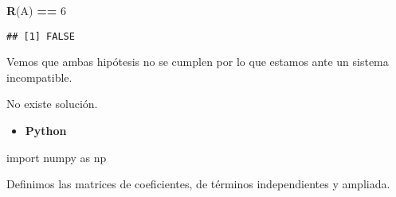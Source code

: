 \documentclass[
]{article}
\newenvironment{Shaded}{\begin{snugshade}}{\end{snugshade}}
\newcommand{\DecValTok}[1]{\textcolor[rgb]{0.00,0.00,0.81}{#1}}
\newcommand{\ImportTok}[1]{#1}
\newcommand{\KeywordTok}[1]{\textcolor[rgb]{0.13,0.29,0.53}{\textbf{#1}}}
\newcommand{\NormalTok}[1]{#1}
\newcommand{\OperatorTok}[1]{\textcolor[rgb]{0.81,0.36,0.00}{\textbf{#1}}}
\newcommand{\StringTok}[1]{\textcolor[rgb]{0.31,0.60,0.02}{#1}}
\providecommand{\tightlist}{%
  \setlength{\itemsep}{0pt}\setlength{\parskip}{0pt}}
\begin{document}
\begin{Shaded}
\begin{Highlighting}[]
\KeywordTok{R}\NormalTok{(A) }\OperatorTok{==}\StringTok{ }\DecValTok{6}
\end{Highlighting}
\end{Shaded}

\begin{verbatim}
## [1] FALSE
\end{verbatim}

Vemos que ambas hipótesis no se cumplen por lo que estamos ante un
sistema incompatible.

No existe solución.

\begin{itemize}
\tightlist
\item
  \textbf{Python}
\end{itemize}

\begin{Shaded}
\begin{Highlighting}[]
\ImportTok{import}\NormalTok{ numpy }\ImportTok{as}\NormalTok{ np}
\end{Highlighting}
\end{Shaded}

Definimos las matrices de coeficientes, de términos independientes y
ampliada.
\end{document}
